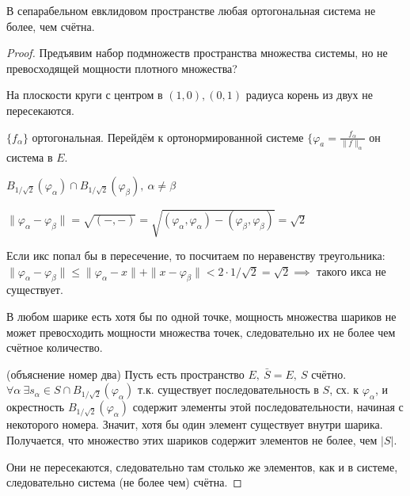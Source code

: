   \begin{theorem}
    В сепарабельном евклидовом пространстве любая ортогональная система не более, чем счётна.
  \end{theorem}
  \begin{proof}
    Предъявим набор подмножеств пространства множества системы, но не превосходящей мощности плотного множества?

    На плоскости круги с центром в $(1,0), (0,1)$ радиуса корень из двух не пересекаются. 

    $\{f_\alpha\}$ ортогональная. Перейдём к ортонормированной системе $\{\varphi_a = \frac{f_\alpha}{\|f\|_\alpha}$ он система в $E$.

    $B_{1/\sqrt{2}}(\varphi_\alpha) \cap B_{1/\sqrt{2}}(\varphi_\beta), \ \alpha\neq \beta$

    $\|\varphi_\alpha - \varphi_\beta\| = \sqrt{(-, -)} = \sqrt{(\varphi_\alpha, \varphi_\alpha) - (\varphi_\beta, \varphi_\beta)} = \sqrt{2}$

    Если икс попал бы в пересечение, то посчитаем по неравенству треугольника: $\|\varphi_\alpha - \varphi_\beta\| \le \| \varphi_\alpha - x \| + \| x - \varphi_\beta \| < 2 \cdot 1/\sqrt{2} = \sqrt{2} \implies$ такого икса не существует.

    В любом шарике есть хотя бы по одной точке, мощность множества шариков не может превосходить мощности множества точек, следовательно их не более чем счётное количество. 

    (объяснение номер два) Пусть есть пространство $E, \ \bar S = E,\ S$ счётно. $\forall \alpha \ \exists s_\alpha \in S \cap B_{1 /\sqrt{2}}(\varphi_\alpha)$ т.к. существует последовательность в $S$, сх. к $\varphi_\alpha$, и окрестность $B_{1/\sqrt{2}}(\varphi_\alpha)$ содержит элементы этой последовательности, начиная с некоторого номера. Значит, хотя бы один элемент существует внутри шарика. Получается, что множество этих шариков содержит элементов не более, чем $|S|$.

    Они не пересекаются, следовательно там столько же элементов, как и в системе, следовательно система (не более чем) счётна.
  \end{proof} 

